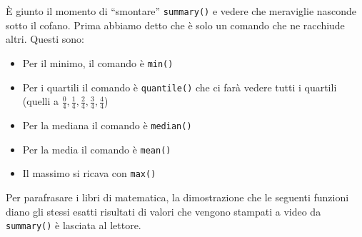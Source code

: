 È giunto il momento di ``smontare'' \texttt{summary()} e vedere che meraviglie
nasconde sotto il cofano. Prima abbiamo detto che è solo un comando che ne
racchiude altri. Questi sono:
\begin{itemize}
 \item Per il minimo, il comando è \texttt{min()}
 \item Per i quartili il comando è \texttt{quantile()} che ci farà
vedere tutti i quartili (quelli a $\frac{0}{4}, \frac{1}{4}, \frac{2}{4},
\frac{3}{4}, \frac{4}{4}$)
 \item Per la mediana il comando è \texttt{median()}
 \item Per la media il comando è \texttt{mean()}
 \item Il massimo si ricava con \texttt{max()}
\end{itemize}

Per parafrasare i libri di matematica, la dimostrazione che le seguenti
funzioni diano gli stessi esatti risultati di valori che vengono stampati a
video da \texttt{summary()} è lasciata al lettore.
